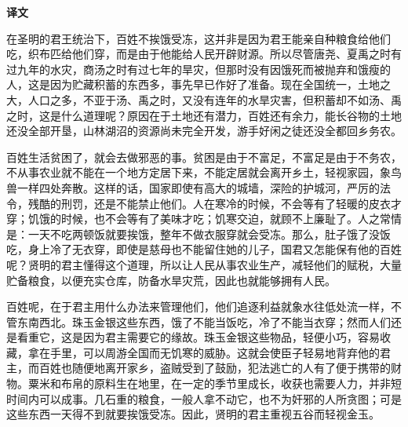 \documentclass[12pt,UTF-8,openany,a4]{ctexbook}
\begin{document}
\newpage

\begin{Large}
    \noindent\textbf{译文}
\end{Large}


\vspace{1em}

\begin{large}
    \yiwen 
    在圣明的君王统治下，百姓不挨饿受冻，这并非是因为君王能亲自种粮食给他们吃，织布匹给他们穿，而是由于他能给人民开辟财源。所以尽管唐尧、夏禹之时有过九年的水灾，商汤之时有过七年的旱灾，但那时没有因饿死而被抛弃和饿瘦的人，这是因为贮藏积蓄的东西多，事先早已作好了准备。现在全国统一，土地之大，人口之多，不亚于汤、禹之时，又没有连年的水旱灾害，但积蓄却不如汤、禹之时，这是什么道理呢？原因在于土地还有潜力，百姓还有余力，能长谷物的土地还没全部开垦，山林湖沼的资源尚未完全开发，游手好闲之徒还没全都回乡务农。
    
    百姓生活贫困了，就会去做邪恶的事。贫困是由于不富足，不富足是由于不务农，不从事农业就不能在一个地方定居下来，不能定居就会离开乡土，轻视家园，象鸟兽一样四处奔散。这样的话，国家即使有高大的城墙，深险的护城河，严厉的法令，残酷的刑罚，还是不能禁止他们。人在寒冷的时候，不会等有了轻暖的皮衣才穿；饥饿的时候，也不会等有了美味才吃；饥寒交迫，就顾不上廉耻了。人之常情是：一天不吃两顿饭就要挨饿，整年不做衣服穿就会受冻。那么，肚子饿了没饭吃，身上冷了无衣穿，即使是慈母也不能留住她的儿子，国君又怎能保有他的百姓呢？贤明的君主懂得这个道理，所以让人民从事农业生产，减轻他们的赋税，大量贮备粮食，以便充实仓库，防备水旱灾荒，因此也就能够拥有人民。
    
    百姓呢，在于君主用什么办法来管理他们，他们追逐利益就象水往低处流一样，不管东南西北。珠玉金银这些东西，饿了不能当饭吃，冷了不能当衣穿；然而人们还是看重它，这是因为君主需要它的缘故。珠玉金银这些物品，轻便小巧，容易收藏，拿在手里，可以周游全国而无饥寒的威胁。这就会使臣子轻易地背弃他的君主，而百姓也随便地离开家乡，盗贼受到了鼓励，犯法逃亡的人有了便于携带的财物。粟米和布帛的原料生在地里，在一定的季节里成长，收获也需要人力，并非短时间内可以成事。几石重的粮食，一般人拿不动它，也不为奸邪的人所贪图；可是这些东西一天得不到就要挨饿受冻。因此，贤明的君主重视五谷而轻视金玉。
    

\end{large}
\end{document}
